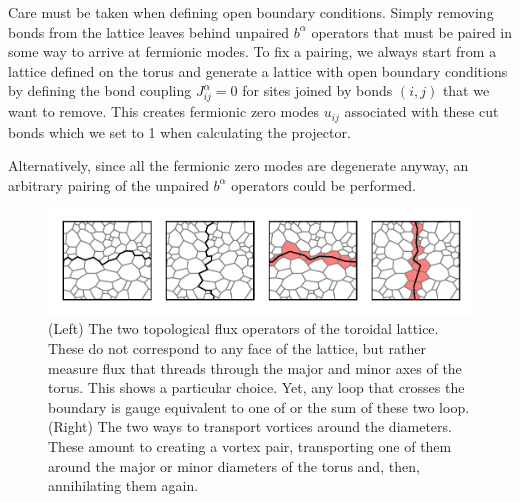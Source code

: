 Care must be taken when defining open boundary conditions. Simply removing bonds from the lattice leaves behind unpaired \(b^\alpha\) operators that must be paired in some way to arrive at fermionic modes. To fix a pairing, we always start from a lattice defined on the torus and generate a lattice with open boundary conditions by defining the bond coupling \(J^{\alpha}_{ij} = 0\) for sites joined by bonds \((i,j)\) that we want to remove. This creates fermionic zero modes \(u_{ij}\) associated with these cut bonds which we set to 1 when calculating the projector.

Alternatively, since all the fermionic zero modes are degenerate anyway, an arbitrary pairing of the unpaired \(b^\alpha\) operators could be performed.

\hypertarget{fig:loops_and_dual_loops}{%
\begin{figure}
\centering
\includegraphics[width=1\textwidth,height=\textheight]{figure_code/amk_chapter/loops_and_dual_loops/loops_and_dual_loops}
\caption[{Topological Loops and Dual Loops}]{(Left) The two topological flux operators of the toroidal lattice. These do not correspond to any face of the lattice, but rather measure flux that threads through the major and minor axes of the torus. This shows a particular choice. Yet, any loop that crosses the boundary is gauge equivalent to one of or the sum of these two loop. (Right) The two ways to transport vortices around the diameters. These amount to creating a vortex pair, transporting one of them around the major or minor diameters of the torus and, then, annihilating them again.}
\label{fig:loops_and_dual_loops}
\end{figure}
}

\begin{Shaded}
\begin{Highlighting}[]

\end{Highlighting}
\end{Shaded}
